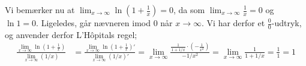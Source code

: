 \documentclass[11pt,a4paper]{article}
\newcommand{\limit}[2]{\lim_{#1 \rightarrow #2}}
\begin{document}
Vi bemærker nu at $\limit{x}{\infty} \ln \left( 1 + \frac{1}{x} \right) = 0$,
da som $\limit{x}{\infty} \frac{1}{x} = 0$ og $\ln 1 = 0$. Ligeledes, går
nævneren imod $0$ når $x \rightarrow \infty$. Vi har derfor et
$\frac{0}{0}$-udtryk, og anvender derfor L'Hôpitals regel;
\begin{align}
    \frac{\limit{x}{\infty} \ln \left( 1 + \frac{1}{x} \right) }
         {\limit{x}{\infty} (1 / x)}
    &= \frac{\limit{x}{\infty} \ln \left( 1 + \frac{1}{x} \right)' }
            {\limit{x}{\infty} (1 / x)'}
     = \limit{x}{\infty}
       \frac{ \frac{1}{1 + 1/x} \cdot \left( -\frac{1}{x^2} \right) }{-1 / x^2}
     = \limit{x}{\infty}
       \frac{1}{1 + 1/x}
     = \frac{1}{1} = 1
\end{align}
\end{document}
